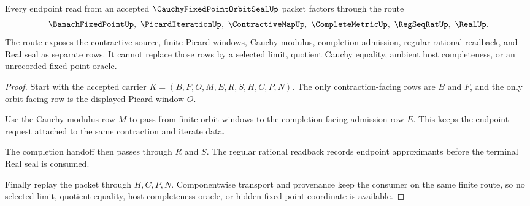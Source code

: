 \begin{theorem}
\label{thm:cauchy-fixed-point-orbit-seal-completion-handoff}
Every endpoint read from an accepted $\CauchyFixedPointOrbitSealUp$ packet factors through the route
$$
\BanachFixedPointUp,\ \PicardIterationUp,\ \ContractiveMapUp,\ \CompleteMetricUp,\ \RegSeqRatUp,\ \RealUp .
$$
The route exposes the contractive source, finite Picard windows, Cauchy modulus, completion admission, regular rational readback, and Real seal as separate rows. It cannot replace those rows by a selected limit, quotient Cauchy equality, ambient host completeness, or an unrecorded fixed-point oracle.
\end{theorem}
\begin{proof}
Start with the accepted carrier $K=(B,F,O,M,E,R,S,H,C,P,N)$. The only contraction-facing rows are $B$ and $F$, and the only orbit-facing row is the displayed Picard window $O$.

Use the Cauchy-modulus row $M$ to pass from finite orbit windows to the completion-facing admission row $E$. This keeps the endpoint request attached to the same contraction and iterate data.

The completion handoff then passes through $R$ and $S$. The regular rational readback records endpoint approximants before the terminal Real seal is consumed.

Finally replay the packet through $H,C,P,N$. Componentwise transport and provenance keep the consumer on the same finite route, so no selected limit, quotient equality, host completeness oracle, or hidden fixed-point coordinate is available.
\end{proof}


\begin{closurestatus}{\CauchyFixedPointOrbitSealUp}
  \theoryclosure{\seedClosure}
  \formalstatus{\unformalizedV}
\end{closurestatus}
